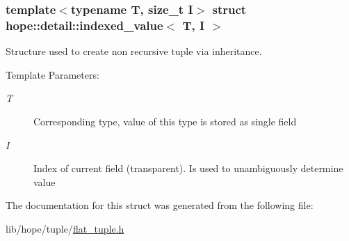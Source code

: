 \subsubsection*{template$<$typename T, size\_\-t I$>$ struct hope::detail::indexed\_\-value$<$ T, I $>$}

Structure used to create non recursive tuple via inheritance. \begin{Desc}
\item[Template Parameters:]
\begin{description}
\item[{\em T}]Corresponding type, value of this type is stored as single field \item[{\em I}]Index of current field (transparent). Is used to unambiguously determine value \end{description}
\end{Desc}


The documentation for this struct was generated from the following file:\begin{CompactItemize}
\item 
lib/hope/tuple/\hyperlink{flat__tuple_8h}{flat\_\-tuple.h}\end{CompactItemize}
